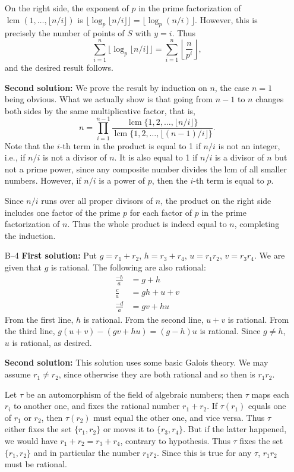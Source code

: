 \documentclass[amssymb,twocolumn,pra,10pt,aps]{revtex4-1}
\DeclareMathOperator{\lcm}{lcm}
\begin{document}
\begin{itemize}
On the right side, the exponent of $p$ in the prime factorization of $\lcm(1,
\dots, \lfloor n/i \rfloor)$ is $\lfloor \log_p \lfloor n/i \rfloor \rfloor
= \lfloor \log_p (n/i) \rfloor$.  However, this is precisely the number
of points of $S$ with $y=i$. Thus
\[
\sum_{i=1}^n
\lfloor \log_p \lfloor n/i \rfloor \rfloor
= \sum_{i =1}^n \left\lfloor \frac{n}{p^i} \right\rfloor,
\]
and the desired result follows.

\textbf{Second solution:}
We prove the result by induction on $n$, the case $n=1$ being obvious.
What we actually show is that going from $n-1$ to $n$ changes both
sides by the same multiplicative factor, that is,
\[
n = \prod_{i=1}^{n-1} \frac{\lcm\{1, 2, \dots, \lfloor n/i \rfloor\}}{\lcm
\{1, 2, \dots, \lfloor (n-1)/i \rfloor\}}.
\]
Note that the $i$-th term in the product is equal to 1 if $n/i$ is not
an integer, i.e., if $n/i$ is not a divisor of $n$.
It is also equal to 1 if $n/i$ is a divisor of $n$ but not a prime power,
since any composite number divides the lcm of all smaller numbers.
However, if $n/i$ is a power of $p$, then the $i$-th term is equal to $p$.

Since $n/i$ runs over all proper divisors of $n$, the product on the right
side includes one factor of the prime $p$
for each factor of $p$ in the prime factorization of $n$. Thus the whole
product is indeed equal to $n$, completing the induction.

\item[B--4]
\textbf{First solution:}
Put $g = r_1 + r_2$, $h = r_3 + r_4$, $u = r_1r_2$, $v = r_3r_4$.
We are given that $g$ is rational. The following are also rational:
\begin{align*}
\frac{-b}{a} &= g+h \\
\frac{c}{a} &= gh + u + v \\
\frac{-d}{a} &= gv + hu
\end{align*}
From the first line, $h$ is rational. From the second line, $u+v$
is rational. From the third line, $g(u+v) - (gv+hu) =
(g-h)u$ is rational. Since $g \neq h$, $u$ is rational, as desired.

\textbf{Second solution:} This solution uses some basic
Galois theory. We may assume $r_1 \neq r_2$, since otherwise they are both
rational and so then is $r_1r_2$.

Let $\tau$ be an automorphism of the field of algebraic numbers; then $\tau$
maps each $r_i$ to another one, and fixes the rational number $r_1 + r_2$.
If $\tau(r_1)$ equals one of $r_1$ or $r_2$, then $\tau(r_2)$ must equal
the other one, and vice versa.  Thus $\tau$ either fixes the set $\{r_1,
r_2\}$ or moves it to $\{r_3, r_4\}$. But if the latter happened, we would
have $r_1 +r_2 = r_3+r_4$, contrary to hypothesis.  Thus $\tau$ fixes the
set $\{r_1, r_2\}$ and in particular the number $r_1r_2$. Since this is
true for any $\tau$, $r_1r_2$ must be rational.


\end{itemize}
\end{document}
